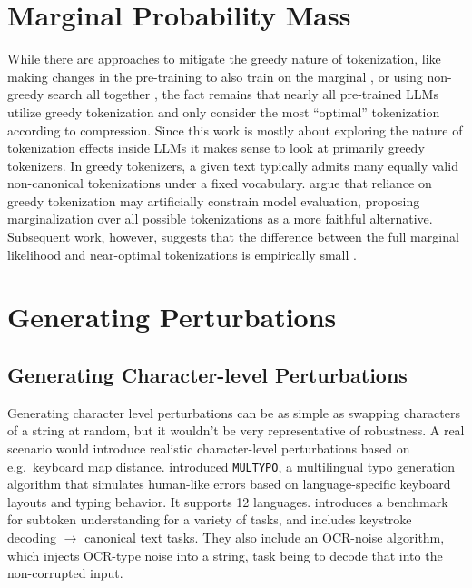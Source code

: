 \documentclass[a4paper]{article}
\begin{document}
\section{Marginal Probability Mass}\label{sec:marginalprob}

While there are approaches to mitigate the greedy nature of tokenization, like making changes in the pre-training to also train on the marginal \parencite{sims2025}, or using non-greedy search all together \parencite{forsythe2025}, the fact remains that nearly all pre-trained LLMs utilize greedy tokenization and only consider the most ``optimal'' tokenization according to compression. Since this work is mostly about exploring the nature of tokenization effects inside LLMs it makes sense to look at primarily greedy tokenizers. In greedy tokenizers, a given text typically admits many equally valid non-canonical tokenizations under a fixed vocabulary. \textcite{cao2021} argue that reliance on greedy tokenization may artificially constrain model evaluation, proposing marginalization over all possible tokenizations as a more faithful alternative. Subsequent work, however, suggests that the difference between the full marginal likelihood and near-optimal tokenizations is empirically small \parencite{chirkova2023, geh2024}.

\section{Generating Perturbations}\label{sec:pergen}

\subsection{Generating Character-level Perturbations}

Generating character level perturbations can be as simple as swapping characters of a string at random, but it wouldn't be very representative of robustness. A real scenario would introduce realistic character-level perturbations based on e.g.\ keyboard map distance. \textcite{liu2025} introduced \texttt{MULTYPO}, a multilingual typo generation algorithm that simulates human-like errors based on language-specific keyboard layouts and typing behavior. It supports 12 languages. \textcite{hou2026} introduces a benchmark for subtoken understanding for a variety of tasks, and includes keystroke decoding $\rightarrow$ canonical text tasks. They also include an OCR-noise algorithm, which injects OCR-type noise into a string, task being to decode that into the non-corrupted input.
\end{document}
